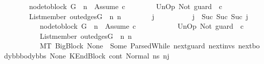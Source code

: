 \begin{isabellebody}
\ \ \ \ \ \ \ {\isachardoublequoteopen}node{\isacharunderscore}{\kern0pt}to{\isacharunderscore}{\kern0pt}block\ G\ {\isacharbang}{\kern0pt}\ n\ {\isacharequal}{\kern0pt}\ {\isacharbrackleft}{\kern0pt}Assume\ c{\isacharbrackright}{\kern0pt}{\isachardoublequoteclose}\ \isanewline
\ \ \ \ \ \ \ {\isachardoublequoteopen}{\isacharparenleft}{\kern0pt}UnOp\ Not\ guard{\isacharparenright}{\kern0pt}\ {\isasymsim}\ c{\isachardoublequoteclose}\isanewline
\ \ \ \ \ \ \ {\isachardoublequoteopen}List{\isachardot}{\kern0pt}member\ {\isacharparenleft}{\kern0pt}out{\isacharunderscore}{\kern0pt}edges{\isacharparenleft}{\kern0pt}G{\isacharparenright}{\kern0pt}\ {\isacharbang}{\kern0pt}\ n{\isacharparenright}{\kern0pt}\ n{}{\isachardoublequoteclose}\isanewline
\ \ \ \ \ \ \ {\isachardoublequoteopen}{\isasymAnd}\ j{\isacharprime}{\kern0pt}{\isacharprime}{\kern0pt}{\isacharprime}{\kern0pt}{\isachardot}{\kern0pt}\isanewline
\ \ \ \ \ \ \ \ \ \ j{\isacharprime}{\kern0pt}\ {\isacharequal}{\kern0pt}\ Suc\ {\isacharparenleft}{\kern0pt}Suc\ {\isacharparenleft}{\kern0pt}Suc\ j{\isacharprime}{\kern0pt}{\isacharprime}{\kern0pt}{\isacharprime}{\kern0pt}{\isacharparenright}{\kern0pt}{\isacharparenright}{\kern0pt}\ {\isasymLongrightarrow}\isanewline
\ \ \ \ \ \ \ \ \ \ node{\isacharunderscore}{\kern0pt}to{\isacharunderscore}{\kern0pt}block\ G\ {\isacharbang}{\kern0pt}\ n\ {\isacharequal}{\kern0pt}\ {\isacharbrackleft}{\kern0pt}Assume\ c{\isacharbrackright}{\kern0pt}\ {\isasymLongrightarrow}\isanewline
\ \ \ \ \ \ \ \ \ \ {\isacharparenleft}{\kern0pt}UnOp\ Not\ guard{\isacharparenright}{\kern0pt}\ {\isasymsim}\ c\ {\isasymLongrightarrow}\isanewline
\ \ \ \ \ \ \ \ \ \ List{\isachardot}{\kern0pt}member\ {\isacharparenleft}{\kern0pt}out{\isacharunderscore}{\kern0pt}edges{\isacharparenleft}{\kern0pt}G{\isacharparenright}{\kern0pt}\ {\isacharbang}{\kern0pt}\ n{\isacharparenright}{\kern0pt}\ n{}\ {\isasymLongrightarrow}\isanewline
\ \ \ \ \ \ \ \ \ \ M{\isacharcomma}{\kern0pt}{\isasymLambda}{\isacharcomma}{\kern0pt}{\isasymGamma}{\isacharcomma}{\kern0pt}{\isasymOmega}{\isacharcomma}{\kern0pt}T\ {\isasymturnstile}{\isacharparenleft}{\kern0pt}{\isacharparenleft}{\kern0pt}BigBlock\ None\ {\isacharbrackleft}{\kern0pt}{\isacharbrackright}{\kern0pt}\ {\isacharparenleft}{\kern0pt}Some\ {\isacharparenleft}{\kern0pt}ParsedWhile\ next{\isacharunderscore}{\kern0pt}guard\ next{\isacharunderscore}{\kern0pt}invs\ {\isacharparenleft}{\kern0pt}next{\isacharunderscore}{\kern0pt}body{\isacharunderscore}{\kern0pt}bb{\isacharhash}{\kern0pt}body{\isacharunderscore}{\kern0pt}bbs{\isacharparenright}{\kern0pt}{\isacharparenright}{\kern0pt}{\isacharparenright}{\kern0pt}\ None{\isacharparenright}{\kern0pt}{\isacharcomma}{\kern0pt}\ KEndBlock\ cont{}{\isacharcomma}{\kern0pt}\ Normal\ ns{}{\isacharprime}{\kern0pt}{\isacharprime}{\kern0pt}{\isacharparenright}{\kern0pt}\ {\isacharminus}{\kern0pt}n{\isasymlongrightarrow}{\isacharcircum}{\kern0pt}j{\isacharprime}{\kern0pt}{\isacharprime}{\kern0pt}{\isacharprime}{\kern0pt}\ \isanewline

\end{isabellebody}

